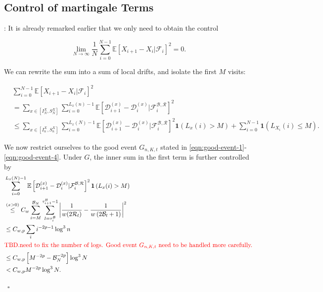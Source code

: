 \documentclass[twoside,12pt,a4paper]{article}
\numberwithin{equation}{section}
\newenvironment{proof}[1][Proof]{{\sc #1}:}{~\hfill $\square$}
\newcommand\TBD{\textcolor{red}{TBD.}}
\begin{document}
\subsection{Control of martingale Terms } 
\begin{proof}[Proof of Proposition~\ref{lm: control of martingale}]
It is already remarked earlier that we only need to obtain the control

\[
	 \lim_{N \to \infty } \frac{1}{N} \sum_{i = 0}^{N-1} \mathbb{E}\left[ X_{i+1} - X_i | \mathcal{F}_i \right]^2 = 0
.\] 


We can rewrite the sum into a sum of local drifts, and isolate the first $M$ visits:

\begin{align}
	&\sum_{i = 0}^{N-1} \mathbb{E}\left[ X_{i+1} - X_i | \mathcal{F}_i \right]^2\\
	&= \sum_{x \in \left[ I_N^X, S_N^X \right]} \sum_{i = 0}^{L_x(n) - 1} \mathbb{E}\left[ \mathcal{D}_{i+1}^{(x)} - \mathcal{D}_i^{(x)} | \mathcal{F}_{i}^{\mathcal{B}, \mathcal{R}} \right]^2  \\
	&\le  \sum_{x \in \left[ I_n^X, S_n^X \right]} \sum_{i = 0}^{L_x(N) - 1} \mathbb{E}\left[ \mathcal{D}_{i+1}^{(x)} - \mathcal{D}_i^{(x)} | \mathcal{F}_{i}^{\mathcal{B}, \mathcal{R}} \right]^2 \mathbf{1}\left( L_x(i) > M \right) + 
	\sum_{i = 0}^{N - 1} \mathbf{1}\left( L_{X_i}(i) \le  M \right) 
	\label{eqn:lem-martingale-1}
.\end{align}

We now restrict ourselves to the good event $G_{n, K, t}$ stated in \eqref{eqn:good-event-1}-\eqref{eqn:good-event-4}. Under $G$,
the inner sum in the first term is further controlled by
\begin{align*}
	&\sum_{i =0}^{ L_x(N) - 1} \mathbb{E}\left[ \mathcal{D}_{i+1}^{(x)} - \mathcal{D}_i^{(x)} | \mathcal{F}_{i}^{\mathcal{B}, \mathcal{R}} \right]^2 \mathbf{1}\left( L_{x}(i) > M \right) \\
	&\stackrel{(x > 0)}{\le} C_w \sum_{i = M}^{\mathcal{B}_N} \sum_{l = \tau_i^{\mathcal{B}}}^{\tau_{i+1}^{\mathcal{B}}-1} 
	\left| \frac{1}{w(2 \mathcal{R}_l)} - \frac{1}{w\left( 2 \mathcal{B}_l + 1 \right) } \right|^2 \\
	&\le C_{w, p} \sum_i i^{- 2 p - 1} \log^3 n \\
	\intertext{\color{red} \TBD need to fix the number of logs. Good event $G_{n, K, t}$ need to be handled more carefully.}
	&\le C_{w, p} \left[ M^{- 2 p} - \mathcal{B}_N^{- 2 p} \right] \log^3 N  \\
	&< C_{w, p} M^{-2 p} \log^3 N
	.
\end{align*}


\end{proof}
\end{document}
